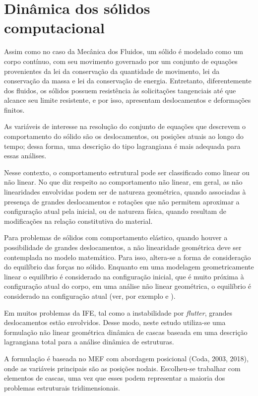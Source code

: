 \chapter[Dinâmica dos sólidos computacional]{Dinâmica dos sólidos computacional} \label{capitulo:Cap4}

Assim como no caso da Mecânica dos Fluidos, um sólido é modelado como um corpo contínuo, com seu movimento governado por um conjunto de equações provenientes da lei da conservação da quantidade de movimento, lei da conservação da massa e lei da conservação de energia. Entretanto, diferentemente dos fluidos, os sólidos possuem resistência às solicitações tangenciais até que alcance seu limite resistente, e por isso, apresentam deslocamentos e deformações finitos. 

As variáveis de interesse na resolução do conjunto de equações que descrevem o comportamento do sólido são os deslocamentos, ou posições atuais ao longo do tempo; dessa forma, uma descrição do tipo lagrangiana é mais adequada para essas análises.

Nesse contexto, o comportamento estrutural pode ser classificado como linear ou não linear. No que diz respeito ao comportamento não linear, em geral, as não linearidades envolvidas podem ser de natureza geométrica, quando associadas à presença de grandes deslocamentos e rotações que não permitem aproximar a configuração atual pela inicial, ou de natureza física, quando resultam de modificações na relação constitutiva do material.

Para problemas de sólidos com comportamento elástico, quando houver a possibilidade de grandes deslocamentos, a não linearidade geométrica deve ser contemplada no modelo matemático. Para isso, altera-se a forma de consideração do equilíbrio das forças no sólido. Enquanto em uma modelagem geometricamente linear o equilíbrio é considerado na configuração inicial, que é muito próxima à configuração atual do corpo, em uma análise não linear geométrica, o equilíbrio é considerado na configuração atual (ver, por exemplo   e ).

Em muitos problemas da IFE, tal como a instabilidade por \textit{flutter}, grandes deslocamentos estão envolvidos. Desse modo, neste estudo utiliza-se uma formulação não linear geométrica dinâmica de cascas baseada em uma descrição lagrangiana total para a análise dinâmica de estruturas. 

A formulação é baseada no MEF com abordagem posicional (Coda, 2003, 2018), onde as variáveis principais são as posições nodais. Escolheu-se trabalhar com elementos de cascas, uma vez que esses podem representar a maioria dos problemas estruturais tridimensionais. 

